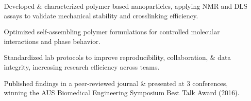 \vspace{-1.5\baselineskip}
\begin{tabitemize}
  \item Developed \& characterized polymer-based nanoparticles, applying NMR and DLS assays to validate mechanical stability and crosslinking efficiency.
  \item Optimized self-assembling polymer formulations for controlled molecular interactions and phase behavior.
  \item Standardized lab protocols to improve reproducibility, collaboration, \& data integrity, increasing research efficiency across teams.
  \item Published findings in a peer-reviewed journal \& presented at 3 conferences, winning the AUS Biomedical Engineering Symposium Best Talk Award (2016).
\end{tabitemize}
\vspace{-1.5\baselineskip}
